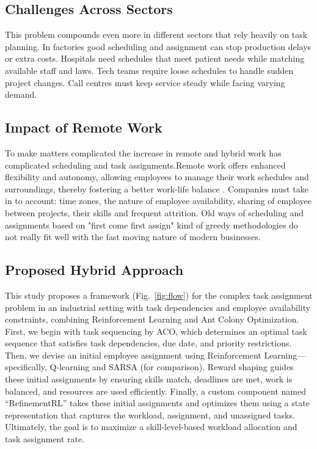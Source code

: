 \documentclass[%
aip,
cp,  %
reprint
]{revtex4-2}
\begin{document}
	\subsection{\label{subsec:challenges}Challenges Across Sectors}
	This problem compounds even more in different sectors that rely heavily on
	task planning. In factories good scheduling and assignment can stop production
	delays or extra costs. Hospitals need schedules that meet patient needs while
	matching available staff and laws. Tech teams require loose schedules to handle
	sudden project changes. Call centres must keep service steady while facing
	varying demand.
	
	\subsection{\label{subsec:remote}Impact of Remote Work}
	To make matters complicated the increase in remote and hybrid work has complicated scheduling and task assignments.Remote work offers enhanced flexibility and autonomy, allowing employees to manage their work schedules and surroundings, thereby fostering a better work-life balance \cite{wang2023}. Companies must take in to account: time zones, the nature of employee availability, sharing of employee between projects, their skills and frequent attrition. Old ways of scheduling and assignments based on "first come first assign" kind of greedy methodologies do not really fit well with the fast moving nature of modern businesses.
	
	
	
	\subsection{\label{subsec:hybrid}Proposed Hybrid Approach}
	This study proposes a framework (Fig.~\ref{fig:flow}) for the complex task
	assignment problem in an industrial setting with task dependencies and
	employee availability constraints, combining Reinforcement Learning and Ant Colony
	Optimization. First, we begin with task sequencing by ACO, which determines an
	optimal task sequence that satisfies task dependencies, due date, and priority
	restrictions. Then, we devise an initial employee assignment using
	Reinforcement Learning—specifically, Q-learning and SARSA (for comparison).
	Reward shaping guides these initial assignments by ensuring skills match, deadlines
	are met, work is balanced, and resources are used efficiently. Finally, a custom
	component named ``RefinementRL'' takes these initial assignments and optimizes
	them using a state representation that captures the workload, assignment, and unassigned
	tasks. Ultimately, the goal is to maximize a skill-level-based workload allocation
	and task assignment rate.
	
\end{document}
